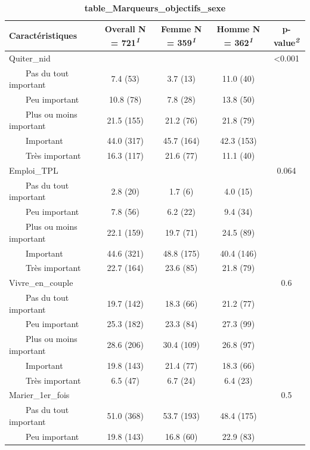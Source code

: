 \documentclass[
]{article}
\begin{document}
\begin{table}[!t]
\caption{\label{tab:unnamed-chunk-54}\textbf{table\_Marqueurs\_objectifs\_sexe}} 
\fontsize{12.0pt}{14.4pt}\selectfont
\begin{tabular*}{\linewidth}{@{\extracolsep{\fill}}lcccc}
\toprule
\textbf{Caractéristiques} & \textbf{Overall}  N = 721\textsuperscript{\textit{1}} & \textbf{Femme}  N = 359\textsuperscript{\textit{1}} & \textbf{Homme}  N = 362\textsuperscript{\textit{1}} & \textbf{p-value}\textsuperscript{\textit{2}} \\ 
\midrule\addlinespace[2.5pt]
Quiter\_nid &  &  &  & <0.001 \\ 
    Pas du tout important & 7.4 (53) & 3.7 (13) & 11.0 (40) &  \\ 
    Peu important & 10.8 (78) & 7.8 (28) & 13.8 (50) &  \\ 
    Plus ou moins important & 21.5 (155) & 21.2 (76) & 21.8 (79) &  \\ 
    Important & 44.0 (317) & 45.7 (164) & 42.3 (153) &  \\ 
    Très important & 16.3 (117) & 21.6 (77) & 11.1 (40) &  \\ 
Emploi\_TPL &  &  &  & 0.064 \\ 
    Pas du tout important & 2.8 (20) & 1.7 (6) & 4.0 (15) &  \\ 
    Peu important & 7.8 (56) & 6.2 (22) & 9.4 (34) &  \\ 
    Plus ou moins important & 22.1 (159) & 19.7 (71) & 24.5 (89) &  \\ 
    Important & 44.6 (321) & 48.8 (175) & 40.4 (146) &  \\ 
    Très important & 22.7 (164) & 23.6 (85) & 21.8 (79) &  \\ 
Vivre\_en\_couple &  &  &  & 0.6 \\ 
    Pas du tout important & 19.7 (142) & 18.3 (66) & 21.2 (77) &  \\ 
    Peu important & 25.3 (182) & 23.3 (84) & 27.3 (99) &  \\ 
    Plus ou moins important & 28.6 (206) & 30.4 (109) & 26.8 (97) &  \\ 
    Important & 19.8 (143) & 21.4 (77) & 18.3 (66) &  \\ 
    Très important & 6.5 (47) & 6.7 (24) & 6.4 (23) &  \\ 
Marier\_1er\_fois &  &  &  & 0.5 \\ 
    Pas du tout important & 51.0 (368) & 53.7 (193) & 48.4 (175) &  \\ 
    Peu important & 19.8 (143) & 16.8 (60) & 22.9 (83) &  \\ 

\end{tabular*}
\end{table}
\end{document}
